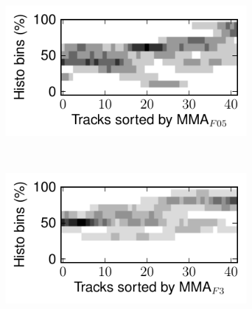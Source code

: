 \documentclass{article}
\begin{document}
\begin{figure}
      \centering
      \begin{subfigure}[b]{0.25\textwidth}
              \includegraphics[width=\textwidth]{plots/histo-human-F05.pdf}
              \caption{}
              \label{fig:histo-human-F05}
      \end{subfigure}%
      ~ 
      \begin{subfigure}[b]{0.25\textwidth}
              \includegraphics[width=\textwidth]{plots/histo-human-F3.pdf}
              \caption{}
              \label{fig:histo-human-F3}
      \end{subfigure}%
       

\end{figure}
\end{document}
